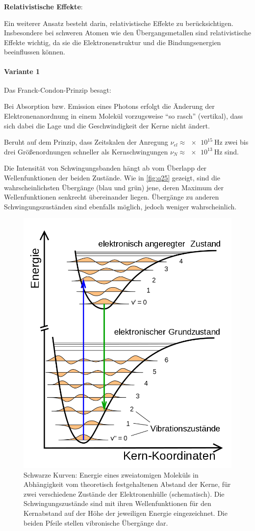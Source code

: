 \textbf{Relativistische Effekte}:

Ein weiterer Ansatz besteht darin, relativistische Effekte zu berücksichtigen. 
Insbesondere bei schweren Atomen wie den Übergangsmetallen sind relativistische Effekte wichtig, da sie die Elektronenstruktur und die Bindungsenergien beeinflussen können.

\label{q:25}

\paragraph{Variante 1}

Das Franck-Condon-Prinzip besagt: 
\begin{mdframed}[backgroundcolor=yellow!20] %
    Bei Absorption bzw. Emission eines Photons erfolgt die Änderung der Elektronenanordnung in einem Molekül vorzugsweise \enquote{so rasch} (vertikal), dass sich dabei die Lage und die Geschwindigkeit der Kerne nicht ändert.
\end{mdframed}

Beruht auf dem Prinzip, dass Zeitskalen der Anregung $\nu_{el} \approx \SI{e15}{\hertz}$ zwei bis drei Größenordnungen schneller als Kernschwingungen $\nu_{N} \approx \SI{e13}{\hertz}$ sind. 

Die Intensität von Schwingungsbanden hängt ab vom Überlapp der Wellenfunktionen der beiden Zustände. Wie in \autoref{fig:q25} gezeigt, sind die wahrscheinlichsten Übergänge (blau und grün) jene, deren Maximum der Wellenfunktionen senkrecht übereinander liegen. Übergänge zu anderen Schwingungszuständen sind ebenfalls möglich, jedoch weniger wahrscheinlich. 

\begin{figure}[H]  
    \centering
    \includegraphics[width=.4\textwidth]{resources/09-05-2012/Franck-Condon-Prinzip.png}
    \caption{Schwarze Kurven: Energie eines zweiatomigen Moleküls in Abhängigkeit vom theoretisch festgehaltenen Abstand der Kerne, für zwei verschiedene Zustände der Elektronenhülle (schematisch). Die Schwingungszustände sind mit ihren Wellenfunktionen für den Kernabstand auf der Höhe der jeweiligen Energie eingezeichnet. Die beiden Pfeile stellen vibronische Übergänge dar.}
    \label{fig:q25}
\end{figure}


